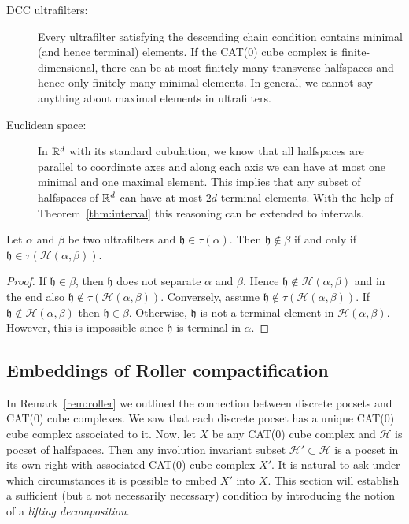 \begin{bsp}
  \label{bsp:finite-terminal}
  \begin{description}
  \item[DCC ultrafilters:] Every ultrafilter satisfying the descending chain condition contains minimal (and hence terminal) elements. If the CAT(0) cube complex is finite-dimensional, there can be at most finitely many transverse halfspaces and hence only finitely many minimal elements. In general, we cannot say anything about maximal elements in ultrafilters. 
  \item[Euclidean space:] In \(\mathbb{R}^d\) with its standard cubulation, we know that all halfspaces are parallel to coordinate axes and along each axis we can have at most one minimal and one maximal element. This implies that any subset of halfspaces of \(\mathbb{R}^d\) can have at most \(2d\) terminal elements. With the help of Theorem~\ref{thm:interval} this reasoning can be extended to intervals.
  \end{description}
\end{bsp}

\begin{lemma}[{\cite[Lemma~4.12]{MR3509968}}]
  \label{lem:4.12}
  Let \(\alpha\) and \(\beta\) be two ultrafilters and \(\mathfrak{h} \in \tau(\alpha)\). Then \(\mathfrak{h} \notin \beta\) if and only if \(\mathfrak{h} \in \tau(\mathcal{H}(\alpha,\beta))\).
\end{lemma}

\begin{proof}
  If \(\mathfrak{h} \in \beta\), then \(\mathfrak{h}\) does not separate \(\alpha\) and \(\beta\). Hence \(\mathfrak{h} \notin \mathcal{H}(\alpha, \beta)\) and in the end also \(\mathfrak{h} \notin \tau(\mathcal{H}(\alpha, \beta))\). Conversely, assume \(\mathfrak{h} \notin \tau(\mathcal{H}(\alpha, \beta))\). If \(\mathfrak{h} \notin \mathcal{H}(\alpha, \beta)\) then \(\mathfrak{h} \in \beta\). Otherwise, \(\mathfrak{h}\) is not a terminal element in \(\mathcal{H}(\alpha, \beta)\). However, this is impossible since \(\mathfrak{h}\) is terminal in \(\alpha\).
\end{proof}

\subsection{Embeddings of Roller compactification}
\label{sec:embedding-roller}
In Remark~\ref{rem:roller} we outlined the connection between discrete pocsets and CAT(0) cube complexes. We saw that each discrete pocset has a unique CAT(0) cube complex associated to it. Now, let \(X\) be any CAT(0) cube complex and \(\mathcal{H}\) is pocset of halfspaces. Then any involution invariant subset \(\mathcal{H}' \subset \mathcal{H}\) is a pocset in its own right with associated CAT(0) cube complex \(X'\). It is natural to ask under which circumstances it is possible to embed \(X'\) into \(X\). This section will establish a sufficient (but a not necessarily necessary) condition by introducing the notion of a \emph{lifting decomposition}.

